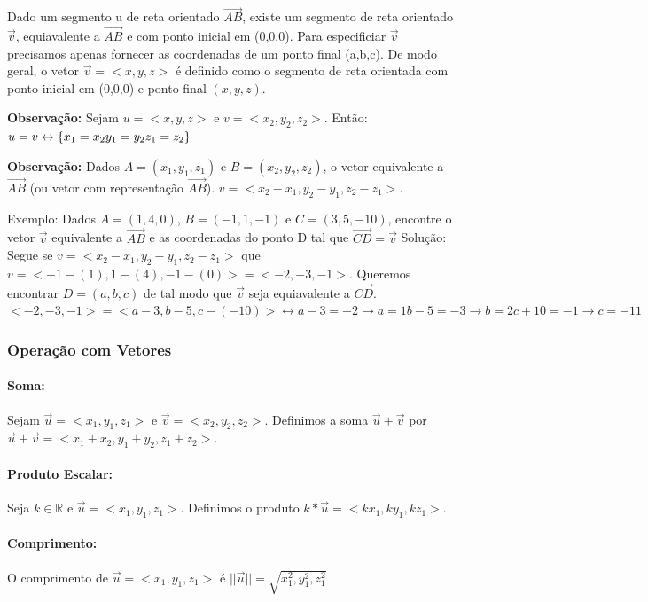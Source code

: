 Dado um segmento u de reta orientado $\overrightarrow{AB}$, existe um segmento de reta orientado $\overrightarrow{v}$, equiavalente a $\overrightarrow{AB}$ e com ponto inicial em (0,0,0). Para especificiar $\overrightarrow{v}$ precisamos apenas fornecer as coordenadas de um ponto final (a,b,c).
De modo geral, o vetor $\overrightarrow{v} = <x,y,z>$ é definido como o segmento de reta orientada com ponto inicial em (0,0,0) e ponto final $(x,y,z)$.


\textbf{Observação:} Sejam $u=<x,y,z>$ e $v=<x_2,y_2,z_2>$. Então: $u=v \leftrightarrow \{x_1 = x_2 \\ y_1 = y_2 \\ z_1 = z_2 \}$


\textbf{Observação:} Dados $A=(x_1,y_1,z_1)$ e $B=(x_2,y_2,z_2)$, o vetor equivalente a $\overrightarrow{AB}$ (ou vetor com representação $\overrightarrow{AB}$). $v = <x_2-x_1, y_2-y_1, z_2-z_1>$.


Exemplo: Dados $A=(1,4,0)$, $B=(-1,1,-1)$ e $C = (3,5,-10)$, encontre o vetor $\overrightarrow{v}$ equivalente a $\overrightarrow{AB}$ e as coordenadas do ponto D tal que $\overrightarrow{CD} = \overrightarrow{v}$
Solução: Segue se $v = <x_2-x_1, y_2-y_1, z_2-z_1>$ que $v=<-1-(1), 1-(4), -1-(0)> = <-2,-3,-1>$. 
Queremos encontrar $D=(a,b,c)$ de tal modo que $\overrightarrow{v}$ seja equiavalente a $\overrightarrow{CD}$.
$<-2,-3,-1> = <a-3,b-5,c-(-10)> \leftrightarrow {a-3 = -2 \rightarrow a=1} {b-5 = -3 \rightarrow b=2} {c+10 = -1 \rightarrow c=-11}$ 

\subsubsection{Operação com Vetores}
\paragraph{Soma:} Sejam $\overrightarrow{u} = <x_1,y_1,z_1>$ e $\overrightarrow{v} = <x_2,y_2,z_2>$. Definimos a soma $\overrightarrow{u} + \overrightarrow{v}$ por $\overrightarrow{u} + \overrightarrow{v} = <x_1+x_2, y_1+y_2, z_1+z_2>$.
\paragraph{Produto Escalar:} Seja $k \in \mathbb{R}$ e $\overrightarrow{u} = <x_1,y_1,z_1>$. Definimos o produto $k*\overrightarrow{u} = <kx_1, ky_1, kz_1>$.
\paragraph{Comprimento:} O comprimento de $\overrightarrow{u} = <x_1, y_1, z_1>$ é $|| \overrightarrow{u} || = \sqrt{x_1^2, y_1^2, z_1^2}$
